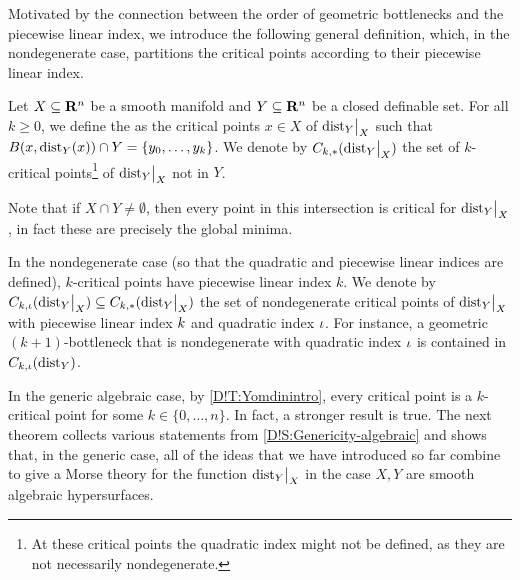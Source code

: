 Motivated by the connection between the order of geometric bottlenecks and the piecewise linear index,
we introduce the following general definition, which, in the nondegenerate case, partitions the critical points according to their piecewise linear index. 

\begin{definition}
\label{D!def:kcrit}
  Let $X\subseteq \mathbf{R}^n$ be a smooth manifold and $Y\subseteq \mathbf{R}^n$ be a closed definable set. For all $k \geq 0$, we define the  as the critical points $x \in X$ of $\mathord{\operatorname{dist}}_Y\big|_X$ such that  $B(x, \operatorname{dist}_Y(x)) \cap Y=\{y_0, \ldots, y_k\}$.
  We denote by $C_{k, *}(\mathord{\operatorname{dist}}_Y\big|_X)$ the set of $k$-critical points\footnote{At these critical points the quadratic index might not be defined, as they are not necessarily nondegenerate.} of $\mathord{\operatorname{dist}}_Y\big|_X$ not in $Y$. 

  Note that if $X\cap Y\neq \emptyset$, then every point in this intersection is critical for $\mathord{\operatorname{dist}}_Y\big|_X$, in fact these are precisely the global minima.

  In the nondegenerate case (so that the quadratic and piecewise linear indices are defined), $k$-critical points have piecewise linear index $k$. We denote by $C_{k, \iota}(\mathord{\operatorname{dist}}_Y\big|_X) \subseteq C_{k, *}(\mathord{\operatorname{dist}}_Y\big|_X)$ the set of nondegenerate critical points of $\mathord{\operatorname{dist}}_Y\big|_X$ with piecewise linear index $k$ and quadratic index $\iota$.
  For instance, a geometric $(k+1)$-bottleneck that is nondegenerate with quadratic index $\iota$ is contained in $C_{k, \iota}(\operatorname{dist}_Y)$.
\end{definition}

In the generic algebraic case, by \cref{D!T:Yomdinintro}, every critical point is a $k$-critical point for some $k \in \{0, \ldots, n\}$.
In fact, a stronger result is true. The next theorem collects various statements from \cref{D!S:Genericity-algebraic} and shows that, in the generic case, all of the ideas that we have introduced so far combine to give a Morse theory for the function $\mathord{\operatorname{dist}}_Y\big|_X$ in the case $X,Y$ are smooth algebraic hypersurfaces.

